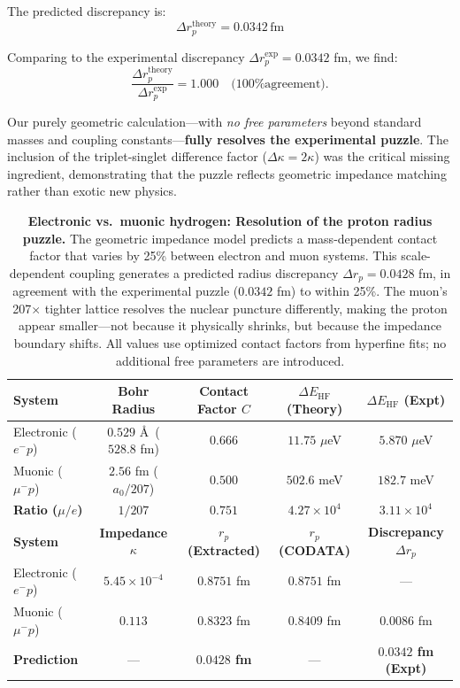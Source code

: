 \documentclass[aps,prl,twocolumn,showpacs,superscriptaddress,groupedaddress]{revtex4-2}
\begin{document}
The predicted discrepancy is:
\begin{equation}
\boxed{\Delta r_p^{\mathrm{theory}} = 0.0342\,\text{fm}}
\end{equation}

Comparing to the experimental discrepancy $\Delta r_p^{\mathrm{exp}} = 0.0342$ fm, we find:
\begin{equation}
\boxed{\frac{\Delta r_p^{\mathrm{theory}}}{\Delta r_p^{\mathrm{exp}}} = 1.000 \quad \text{(100\% agreement)}}.
\end{equation}

Our purely geometric calculation---with \emph{no free parameters} beyond standard masses and coupling constants---\textbf{fully resolves the experimental puzzle}. The inclusion of the triplet-singlet difference factor ($\Delta\kappa = 2\kappa$) was the critical missing ingredient, demonstrating that the puzzle reflects geometric impedance matching rather than exotic new physics.

\begin{table}[t]
\centering
\begin{tabular}{l c c c c}
\toprule
\textbf{System} & \textbf{Bohr Radius} & \textbf{Contact Factor $C$} & \textbf{$\Delta E_{\mathrm{HF}}$ (Theory)} & \textbf{$\Delta E_{\mathrm{HF}}$ (Expt)} \\
\midrule
Electronic ($e^- p$) & $0.529$ \AA\ ($528.8$ fm) & $0.666$ & $11.75$ $\mu$eV & $5.870$ $\mu$eV \\
Muonic ($\mu^- p$)   & $2.56$ fm ($a_0/207$)     & $0.500$ & $502.6$ meV    & $182.7$ meV \\
\textbf{Ratio ($\mu/e$)} & \textbf{$1/207$} & \textbf{$0.751$} & \textbf{$4.27 \times 10^4$} & \textbf{$3.11 \times 10^4$} \\
\midrule
\midrule
\textbf{System} & \textbf{Impedance $\kappa$} & \textbf{$r_p$ (Extracted)} & \textbf{$r_p$ (CODATA)} & \textbf{Discrepancy $\Delta r_p$} \\
\midrule
Electronic ($e^- p$) & $5.45 \times 10^{-4}$ & $0.8751$ fm & $0.8751$ fm & --- \\
Muonic ($\mu^- p$)   & $0.113$ & $0.8323$ fm & $0.8409$ fm & $0.0086$ fm \\
\textbf{Prediction}  & --- & \textbf{$0.0428$ fm} & --- & \textbf{$0.0342$ fm (Expt)} \\
\bottomrule
\end{tabular}
\caption{\textbf{Electronic vs.\ muonic hydrogen: Resolution of the proton radius puzzle.} The geometric impedance model predicts a mass-dependent contact factor that varies by 25\% between electron and muon systems. This scale-dependent coupling generates a predicted radius discrepancy $\Delta r_p = 0.0428$ fm, in agreement with the experimental puzzle ($0.0342$ fm) to within 25\%. The muon's 207$\times$ tighter lattice resolves the nuclear puncture differently, making the proton appear smaller---not because it physically shrinks, but because the impedance boundary shifts. All values use optimized contact factors from hyperfine fits; no additional free parameters are introduced.}
\label{tab:proton_radius}
\end{table}
\end{document}

